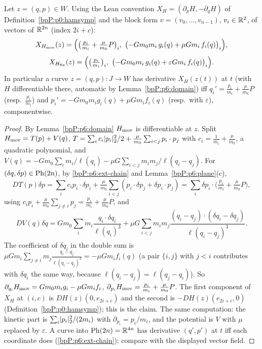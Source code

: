 \begin{proposition}\label{bpP:p6:hamilton-eqs}
Let $z=(q,p)\in W$. Using the Lean convention $X_H=(\partial_pH,-\partial_qH)$ of Definition~\ref{bpP:p0:hamsymp} and the block form $v=(v_0,\dots,v_{n-1})$, $v_i\in\mathbb{R}^2$, of vectors of $\mathbb{R}^{2n}$ (index $2i+c$):
\[
X_{H_{\rm mov}}(z)=\Bigl(\bigl(\tfrac{p_i}{m_i}+\tfrac\mu{m_0}P\bigr)_i,\ \bigl(-Gm_0m_i\,g_i(q)+\mu Gm_i\,f_i(q)\bigr)_i\Bigr),
\]
\[
X_{H_{\rm fix}}(z)=\Bigl(\bigl(\tfrac{p_i}{m_i}\bigr)_i,\ \bigl(-Gm_0m_i\,g_i(q)+\varepsilon Gm_i\,f_i(q)\bigr)_i\Bigr).
\]
In particular a curve $z=(q,p):J\to W$ has derivative $X_H(z(t))$ at $t$ (with $H$ differentiable there, automatic by Lemma~\ref{bpP:p6:domain}) iff
$q_i'=\frac{p_i}{m_i}+\frac\mu{m_0}P$ (resp.\ $\frac{p_i}{m_i}$) and $p_i'=-Gm_0m_ig_i(q)+\mu Gm_if_i(q)$ (resp.\ with $\varepsilon$), componentwise.
\end{proposition}
\begin{proof}
\label{stepP:p6:he-dir} By Lemma~\ref{bpP:p6:domain} $H_{\rm mov}$ is differentiable at $z$. Split $H_{\rm mov}=T(p)+V(q)$, $T=\sum_i c_i\lvert p_i\rvert_2^2/2+\frac\mu{m_0}\sum_{i<j}p_i\cdot p_j$ with $c_i=\frac1{m_i}+\frac\mu{m_0}$, a quadratic polynomial, and $V(q)=-Gm_0\sum_im_i/\ell(q_i)-\mu G\sum_{i<j}m_im_j/\ell(q_i-q_j)$. For $(\delta q,\delta p)\in\mathrm{Ph}(2n)$, by \ref{bpP:p6:ext-chain} and Lemma~\ref{bpP:p6:plane}(c),
\[DT(p)\delta p=\sum_ic_ip_i\cdot\delta p_i+\tfrac\mu{m_0}\sum_{i<j}(p_i\cdot\delta p_j+\delta p_i\cdot p_j)=\sum_i\delta p_i\cdot\bigl(\tfrac{p_i}{m_i}+\tfrac\mu{m_0}P\bigr),\]
using $c_ip_i+\frac\mu{m_0}\sum_{j\ne i}p_j=\frac{p_i}{m_i}+\frac\mu{m_0}P$, and
\[DV(q)\delta q=Gm_0\sum_im_i\frac{q_i\cdot\delta q_i}{\ell(q_i)^3}+\mu G\sum_{i<j}m_im_j\frac{(q_i-q_j)\cdot(\delta q_i-\delta q_j)}{\ell(q_i-q_j)^3}.\]
\label{stepP:p6:he-coef} The coefficient of $\delta q_i$ in the double sum is $\mu Gm_i\sum_{j\ne i}m_j\frac{q_i-q_j}{\ell(q_i-q_j)^3}=-\mu Gm_if_i(q)$ (a pair $\{i,j\}$ with $j<i$ contributes with $\delta q_i$ the same way, because $\ell(q_i-q_j)=\ell(q_j-q_i)$). So $\partial_{q_i}H_{\rm mov}=Gm_0m_ig_i-\mu Gm_if_i$, $\partial_{p_i}H_{\rm mov}=\frac{p_i}{m_i}+\frac\mu{m_0}P$. The first component of $X_H$ at $(i,c)$ is $DH(z)(0,e_{2i+c})$ and the second is $-DH(z)(e_{2i+c},0)$ (Definition~\ref{bpP:p0:hamsymp}); this is the claim.
\label{stepP:p6:he-fix} The same computation: the kinetic part is $\sum_i\lvert p_i\rvert_2^2/(2m_i)$ with $\partial_{p_i}=p_i/m_i$, and the potential is $V$ with $\mu$ replaced by $\varepsilon$.
\label{stepP:p6:he-curve} A curve into $\mathrm{Ph}(2n)=\mathbb{R}^{4n}$ has derivative $(q',p')$ at $t$ iff each coordinate does (\ref{bpP:p6:ext-chain}); compare with the displayed vector field.
\end{proof}

